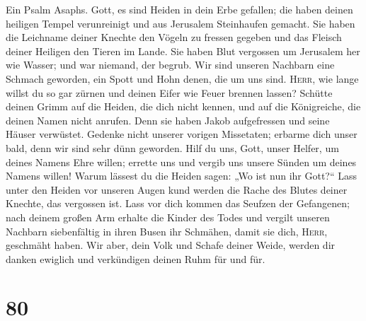  Ein Psalm Asaphs. Gott, es sind Heiden in dein Erbe
gefallen; die haben deinen heiligen Tempel verunreinigt und aus
Jerusalem Steinhaufen gemacht.  Sie haben die Leichname
deiner Knechte den Vögeln zu fressen gegeben und das Fleisch deiner
Heiligen den Tieren im Lande.  Sie haben Blut vergossen um
Jerusalem her wie Wasser; und war niemand, der begrub. 
Wir sind unseren Nachbarn eine Schmach geworden, ein Spott und Hohn
denen, die um uns sind.  \textsc{Herr}, wie lange willst
du so gar zürnen und deinen Eifer wie Feuer brennen lassen?
 Schütte deinen Grimm auf die Heiden, die dich nicht
kennen, und auf die Königreiche, die deinen Namen nicht anrufen.
 Denn sie haben Jakob aufgefressen und seine Häuser
verwüstet.  Gedenke nicht unserer vorigen Missetaten;
erbarme dich unser bald, denn wir sind sehr dünn geworden.
 Hilf du uns, Gott, unser Helfer, um deines Namens Ehre
willen; errette uns und vergib uns unsere Sünden um deines Namens
willen!  Warum lässest du die Heiden sagen: „Wo ist nun
ihr Gott?{}`` Lass unter den Heiden vor unseren Augen kund werden die
Rache des Blutes deiner Knechte, das vergossen ist.  Lass
vor dich kommen das Seufzen der Gefangenen; nach deinem großen Arm
erhalte die Kinder des Todes  und vergilt unseren
Nachbarn siebenfältig in ihren Busen ihr Schmähen, damit sie dich,
\textsc{Herr}, geschmäht haben.  Wir aber, dein Volk und
Schafe deiner Weide, werden dir danken ewiglich und verkündigen deinen
Ruhm für und für.

\hypertarget{section-79}{%
\section{80}\label{section-79}}

